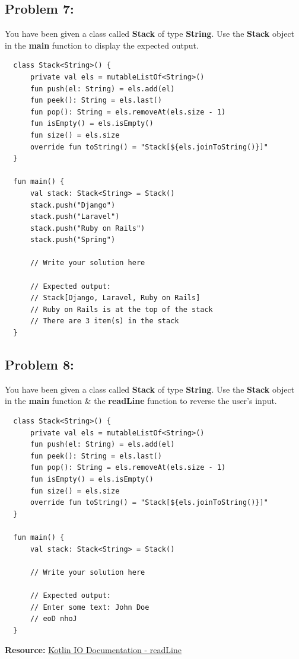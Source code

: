 \documentclass{article}
\begin{document}
\subsection*{Problem 7:}
You have been given a class called \textbf{Stack} of type \textbf{String}. Use the \textbf{Stack} object in the \textbf{main} function to display the expected output.

\begin{verbatim}
  class Stack<String>() {
      private val els = mutableListOf<String>()
      fun push(el: String) = els.add(el)
      fun peek(): String = els.last()
      fun pop(): String = els.removeAt(els.size - 1)
      fun isEmpty() = els.isEmpty()
      fun size() = els.size
      override fun toString() = "Stack[${els.joinToString()}]"
  }

  fun main() {
      val stack: Stack<String> = Stack()
      stack.push("Django")
      stack.push("Laravel")
      stack.push("Ruby on Rails")
      stack.push("Spring")

      // Write your solution here

      // Expected output:
      // Stack[Django, Laravel, Ruby on Rails]
      // Ruby on Rails is at the top of the stack
      // There are 3 item(s) in the stack
  }
\end{verbatim}

\subsection*{Problem 8:}
You have been given a class called \textbf{Stack} of type \textbf{String}. Use the \textbf{Stack} object in the \textbf{main} function \& the \textbf{readLine} function to reverse the user's input.

\begin{verbatim}
  class Stack<String>() {
      private val els = mutableListOf<String>()
      fun push(el: String) = els.add(el)
      fun peek(): String = els.last()
      fun pop(): String = els.removeAt(els.size - 1)
      fun isEmpty() = els.isEmpty()
      fun size() = els.size
      override fun toString() = "Stack[${els.joinToString()}]"
  }

  fun main() {
      val stack: Stack<String> = Stack()

      // Write your solution here

      // Expected output:
      // Enter some text: John Doe
      // eoD nhoJ
  }
\end{verbatim}

\textbf{Resource:} \href{https://kotlinlang.org/api/latest/jvm/stdlib/kotlin.io/read-line.html}{Kotlin IO Documentation - readLine}
\end{document}
